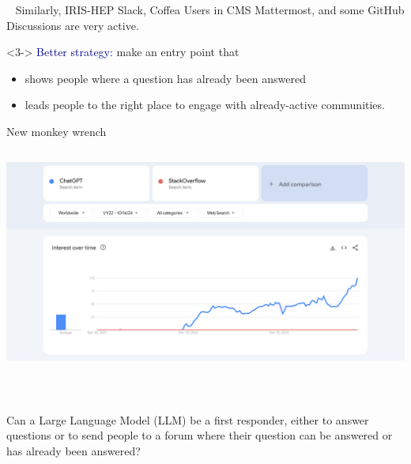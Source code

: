 \documentclass[aspectratio=169]{beamer}
\begin{document}
\begin{frame}{\mbox{ }}
\large
\vspace{0.5 cm}
Similarly, IRIS-HEP Slack, Coffea Users in CMS Mattermost, and some GitHub Discussions are very active.

\vspace{1 cm}

\vspace{1 cm}
\begin{uncoverenv}<3->
\textcolor{darkblue}{Better strategy:} make an entry point that

\vspace{0.25 cm}
\begin{itemize}
\item shows people where a question has already been answered
\item leads people to the right place to engage with already-active communities.
\end{itemize}
\end{uncoverenv}
\end{frame}

\begin{frame}{New monkey wrench}
\vspace{0.17 cm}
\begin{columns}
\includegraphics[width=\linewidth]{PLOTS/googletrends-chatgpt.png}
\end{columns}
\end{frame}

\begin{frame}{\mbox{ }}
\Large
\vspace{1 cm}

Can a Large Language Model (LLM) be a first responder, either to answer questions or to send people to a forum where their question can be answered or has already been answered?

\vspace{0.5 cm}
\begin{center}
\end{center}
\end{frame}
\end{document}
